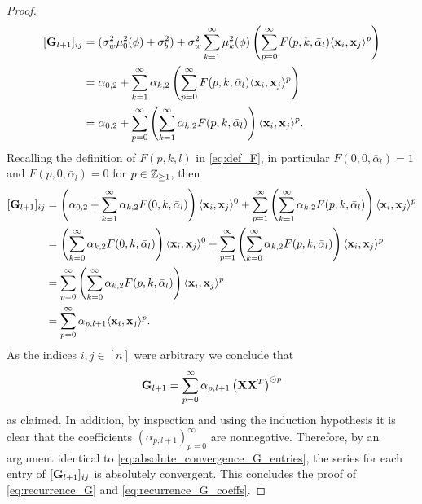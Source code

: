 \begin{proof}
    \[
    \begin{aligned}
    [\mG_{l+1}]_{ij} &= (\sigma_w^2\mu_0^2(\phi) + \sigma_b^2) + \sigma_w^2\sum_{k=1}^{\infty}\mu_k^2(\phi)\left(\sum_{p=0}^{\infty} F(p,k,\bar{\alpha}_{l}) \langle \vx_i, \vx_j \rangle^p\right)\\
    & = \alpha_{0,2} + \sum_{k=1}^{\infty}\alpha_{k,2}\left(\sum_{p=0}^{\infty} F(p,k,\bar{\alpha}_{l}) \langle \vx_i, \vx_j \rangle^p\right)\\
    & = \alpha_{0,2} + \sum_{p=0}^{\infty} \left(\sum_{k=1}^{\infty}\alpha_{k,2} F(p,k,\bar{\alpha}_{l}) \right) \langle \vx_i, \vx_j \rangle^p . 
    \end{aligned}
    \]
    Recalling the definition of $F(p,k,l)$ in \eqref{eq:def_F}, in particular $F(0,0,\bar{\alpha}_l) = 1$ and $F(p,0,\bar{\alpha}_l) = 0$ for $p \in \mathbb{Z}_{\geq 1}$, then
    \[
    \begin{aligned}
     [\mG_{l+1}]_{ij} & = \left(\alpha_{0,2} + \sum_{k=1}^{\infty}\alpha_{k,2} F(0,k,\bar{\alpha}_l)\right) \langle \vx_i, \vx_j \rangle^0 + \sum_{p=1}^{\infty} \left(\sum_{k=1}^{\infty}\alpha_{k,2} F(p,k,\bar{\alpha}_{l}) \right) \langle \vx_i, \vx_j \rangle^p\\
    & = \left(\sum_{k=0}^{\infty}\alpha_{k,2} F(0, k, \bar{\alpha}_l)\right)\langle \vx_i, \vx_j \rangle^0 + \sum_{p=1}^{\infty} \left(\sum_{k=0}^{\infty}\alpha_{k,2} F(p,k,\bar{\alpha}_{l}) \right) \langle \vx_i, \vx_j \rangle^p\\
    & = \sum_{p=0}^{\infty} \left(\sum_{k=0}^{\infty}\alpha_{k,2} F(p,k,\bar{\alpha}_{l}) \right) \langle \vx_i, \vx_j \rangle^p\\
    & = \sum_{p=0}^{\infty} \alpha_{p, l+1} \langle \vx_i, \vx_j \rangle^p.
    \end{aligned}
    \]
    As the indices $i,j \in [n]$ were arbitrary we conclude that
    \[
    \mathbf{G}_{l+1} = \sum_{p=0}^{\infty} \alpha_{p, l+1} \left( \mathbf{X} \mathbf{X}^T\right)^{\odot p}
    \]
    as claimed. In addition, by inspection and using the induction hypothesis it is clear that the coefficients $(\alpha_{p,l+1})_{p=0}^{\infty}$ are nonnegative. Therefore, by an argument identical to \eqref{eq:absolute_convergence_G_entries}, the series for each entry of $[\mathbf{G}_{l+1}]_{ij}$ is absolutely convergent. This concludes the proof of \eqref{eq:recurrence_G} and \eqref{eq:recurrence_G_coeffs}. 
    

\end{proof}
